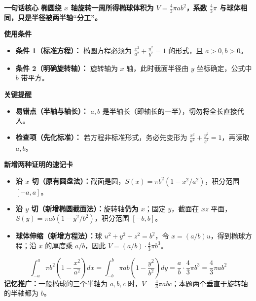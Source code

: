 \begin{summarybox}
	\textbf{\textcolor{CSummary}{一句话核心}}
	\textbf{椭圆绕 \(x\) 轴旋转一周所得椭球体积为 \(V=\frac{4}{3}\pi a b^{2}\)，系数 \(\frac{4}{3}\pi\) 与球体相同，只是半径被两半轴“分工”。}

	\medskip
	\textbf{\textcolor{CSummary}{使用条件}}
	\begin{itemize}[leftmargin=*, itemsep=0.5em, topsep=0.4em]
		\item \textbf{条件 1（标准方程）：} 椭圆方程必须为 \(\frac{x^{2}}{a^{2}}+\frac{y^{2}}{b^{2}}=1\) 的形式，且 \(a>0,b>0\)。
		\item \textbf{条件 2（明确旋转轴）：} 旋转轴为 \(x\) 轴，此时截面半径由 \(y\) 坐标确定，公式中 \(b\) 带平方。
	\end{itemize}

	\medskip
	\textbf{\textcolor{CSummary}{关键提醒}}
	\begin{itemize}[leftmargin=*, itemsep=0.5em, topsep=0.4em]
		\item \textbf{易错点（半轴与轴长）：} \(a,b\) 是半轴长（即轴长的一半），切勿将全长直接代入。
		\item \textbf{检查项（先化标准）：} 若方程非标准形式，务必先变形为 \(\frac{x^{2}}{a^{2}}+\frac{y^{2}}{b^{2}}=1\)，再读取 \(a,b\)。
	\end{itemize}
	\begin{center}
		
	\end{center}
	\medskip
	\textbf{\textcolor{CSummary}{新增两种证明的速记卡}}
	\begin{itemize}[leftmargin=*, itemsep=0.5em, topsep=0.4em]
		\item \textbf{沿 \(x\) 切（原有圆盘法）：}截面是圆，\(S(x)=\pi b^{2}(1-x^{2}/a^{2})\)，积分范围 \([-a,a]\)。
		\item \textbf{沿 \(y\) 切（新增椭圆截面法）：}旋转轴\textbf{仍为 \(x\)}；固定 \(y\)，截面在 \(xz\) 平面，\(S(y)=\pi ab(1-y^{2}/b^{2})\)，积分范围 \([-b,b]\)。
		\item \textbf{球体伸缩（新增方程法）：}球 \(u^{2}+y^{2}+z^{2}=b^{2}\)，令 \(x=(a/b)u\)，得到椭球方程；沿 \(x\) 的厚度乘 \(a/b\)，因此 \(V=(a/b)\cdot\frac43\pi b^{3}\)。
	\end{itemize}
	\[
	\boxed{\int_{-a}^{a}\pi b^{2}\left(1-\frac{x^{2}}{a^{2}}\right)dx
	=\int_{-b}^{b}\pi ab\left(1-\frac{y^{2}}{b^{2}}\right)dy
	=\frac{a}{b}\cdot\frac43\pi b^{3}
	=\frac43\pi ab^{2}}
	\]
	\textbf{记忆推广：}一般椭球的三个半轴为 \(a,b,c\) 时，\(V=\frac43\pi abc\)；本题两个垂直于旋转轴的半轴都为 \(b\)。

\end{summarybox}
